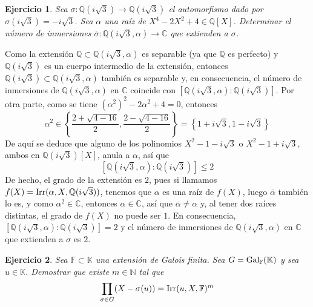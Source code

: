 \documentclass[11pt]{report}
\makeatletter
\renewenvironment{proof}[1][\proofname]{\par
  \pushQED{\qed}%
  \normalfont \topsep\z@skip %
  \trivlist
  \item[\hskip\labelsep
        \itshape
    #1\@addpunct{.}]\ignorespaces
}{%
  \popQED\endtrivlist\@endpefalse
}
\newcommand{\N}{\mathbb N}
\newcommand{\Q}{\mathbb Q}
\newcommand{\C}{\mathbb C}
\newcommand{\F}{\mathbb F}
\newcommand{\K}{\mathbb K}
\newtheorem{ejercicio}{Ejercicio}
\makeatother
\begin{document}
    \begin{ejercicio}
        Sea $\sigma \colon \Q(i\sqrt{3}) \to \Q(i\sqrt{3})$ el automorfismo dado por $\sigma(i\sqrt{3})=-i\sqrt{3}$. Sea $\alpha$ una raíz de $X^4-2X^2+4 \in \Q[X]$. Determinar el número de inmersiones $\overline{\sigma} \colon \Q(i\sqrt{3},\alpha) \to \C$ que extienden a $\sigma$.
    \end{ejercicio}
    
    \begin{proof}
    Como la extensión $\Q \subset \Q(i\sqrt{3},\alpha)$ es separable (ya que $\Q$ es perfecto) y $\Q(i\sqrt{3})$ es un cuerpo intermedio de la extensión, entonces $\Q(i\sqrt{3}) \subset \Q(i\sqrt{3},\alpha)$ también es separable y, en consecuencia, el número de inmersiones de $\Q(i\sqrt{3},\alpha)$ en $\C$ coincide con $[\Q(i\sqrt{3},\alpha) \colon \Q(i\sqrt{3})]$. Por otra parte, como se tiene $(\alpha^2)^2-2\alpha^2+4=0$, entonces
    \[\alpha^2 \in \left\{\frac{2+\sqrt{4-16}}{2},\frac{2-\sqrt{4-16}}{2} \right\} = \left\{1+i\sqrt{3}, 1-i\sqrt{3}\right\}\]
    De aquí se deduce que alguno de los polinomios $X^2-1-i\sqrt{3}$ o $X^2-1+i\sqrt{3}$, ambos en $\Q(i\sqrt{3})[X]$, anula a $\alpha$, así que \[[\Q(i\sqrt{3},\alpha) \colon \Q(i\sqrt{3})] \leq 2\] De hecho, el grado de la extensión es $2$, pues si llamamos $f(X)=\textup{Irr}(\alpha,X,\Q(i\sqrt{3}))$, tenemos que $\alpha$ es una raíz de $f(X)$, luego $\overline{\alpha}$ también lo es, y como $\alpha^2 \in \C$, entonces $\alpha \in \C$, así que $\overline{\alpha} \neq \alpha$ y, al tener dos raíces distintas, el grado de $f(X)$ no puede ser $1$. En consecuencia, $[\Q(i\sqrt{3},\alpha) \colon \Q(i\sqrt{3})] = 2$ y el número de inmersiones de $\Q(i\sqrt{3},\alpha)$ en $\C$ que extienden a $\sigma$ es $2$.
    \end{proof}

\begin{ejercicio}
Sea $\F \subset \K$ una extensión de Galois finita. Sea $G = \textup{Gal}_\F(\K)$ y sea $u \in \K$. Demostrar que existe $m \in \N$ tal que
\[\prod_{\sigma \in G}(X-\sigma(u)) = \textup{Irr}(u,X,\F)^m\]
\end{ejercicio}
\end{document}
